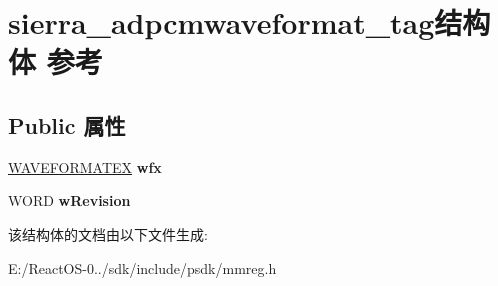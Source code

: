 \hypertarget{structsierra__adpcmwaveformat__tag}{}\section{sierra\+\_\+adpcmwaveformat\+\_\+tag结构体 参考}
\label{structsierra__adpcmwaveformat__tag}
\subsection*{Public 属性}
\begin{DoxyCompactItemize}
\item 
\mbox{\label{structsierra__adpcmwaveformat__tag_ab05a68845b2691e1fd79f9afde53ee2d}} 
\hyperlink{struct_w_a_v_e_f_o_r_m_a_t_e_x}{W\+A\+V\+E\+F\+O\+R\+M\+A\+T\+EX} {\bfseries wfx}
\item 
\mbox{\label{structsierra__adpcmwaveformat__tag_a8361bbb51ab79d8d440b559730ccf722}} 
W\+O\+RD {\bfseries w\+Revision}
\end{DoxyCompactItemize}


该结构体的文档由以下文件生成\+:\begin{DoxyCompactItemize}
\item 
E\+:/\+React\+O\+S-\/0../sdk/include/psdk/mmreg.\+h\end{DoxyCompactItemize}
